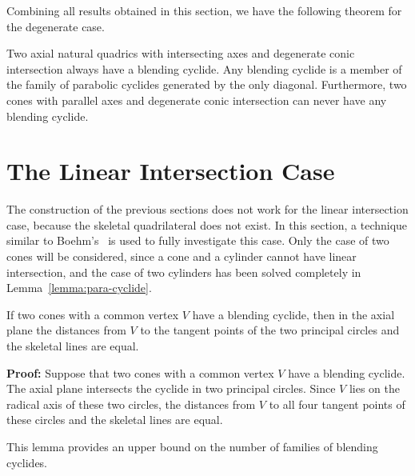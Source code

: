      Combining all results obtained in this section, we have the following 
theorem for the degenerate case.

\begin{theorem}
\label{thm:cyclide<->planar-degen}
     Two axial natural quadrics with intersecting axes and degenerate conic
intersection always have a blending cyclide.  Any blending 
cyclide is a member of the family of parabolic cyclides generated by the only 
diagonal.  Furthermore, two cones with parallel axes and degenerate conic
intersection can never have any blending cyclide.
\end{theorem}


\section{The Linear Intersection Case}
\label{section:cyc-linear}

     The construction of the previous sections does not work for the linear
intersection case, because the skeletal quadrilateral does not exist.  
In this section, a technique similar to Boehm's~\cite{boehm:1990}
is used to fully investigate this case.  Only the case of two cones 
will be considered, since a cone and a cylinder cannot have linear 
intersection, and the case of two cylinders has been solved completely in 
Lemma~\ref{lemma:para-cyclide}.

\begin{lemma}
\label{lemma:all-dist-equal}
     If two cones with a common vertex $V$ have a blending cyclide, then 
in the axial plane the distances from $V$ to the tangent points of the two 
principal circles and the skeletal lines are equal.
\end{lemma}
{\bf Proof:} Suppose that two cones with a common vertex $V$ have a 
blending cyclide.  The axial plane intersects the cyclide in two principal 
circles.  Since $V$ lies on the radical axis of these two circles, the 
distances from $V$ to all four tangent points of these circles and the 
skeletal lines are equal. \QED

     This lemma provides an upper bound on the number of families of
blending cyclides.  


